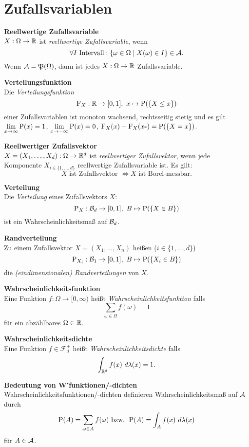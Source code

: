 \section{Zufallsvariablen}
\textbf{Reellwertige Zufallsvariable}\\
$X:\Omega\to\R$ ist \textit{reellwertige Zufallsvariable}, wenn
\[
	\forall I \text{ Intervall}: \{\omega\in\Omega\mid X(\omega)\in I\}\in\A.
\]
Wenn $\A=\mathfrak{P}(\Omega)$, dann ist jedes $X:\Omega\to\R$ Zufallsvariable.

\textbf{Verteilungsfunktion}\\
Die \textit{Verteilungsfunktion}
\[
	\F_X:\R\to[0,1],\ x\mapsto\P(\{X\leq x\})
\]
einer Zufallsvariablen ist monoton wachsend, rechtsseitig stetig und es gilt\\
$\lim\limits_{x\to\infty}\P(x)=1$,
$\lim\limits_{x\to -\infty}\P(x)=0$, 
\mbox{$\F_X(x)-\F_X(x\textbf{-})=\P(\{X=x\})$}.

\textbf{Reellwertiger Zufallsvektor}\\
$X=(X_1,\ldots,X_d):\Omega\to\R^d$ ist \textit{reellwertiger Zufallsvektor}, wenn jede
Komponente $X_{i\in\{1,\ldots,d\}}$ reellwertige Zufallsvariable ist. Es gilt:\\
\[
	X \text{ ist Zufallsvektor } \Leftrightarrow X \text{ ist Borel-messbar.}
\]

\textbf{Verteilung}\\
Die \textit{Verteilung} eines Zufallsvektors $X$: 
\[
	\P_X: \B{d}\to [0,1],\ B\mapsto\P(\{X\in B\})
\]
ist ein Wahrscheinlichkeitsmaß auf $\B{d}$.

\textbf{Randverteilung}\\
Zu einem Zufallsvektor $X=(X_1,\ldots,X_n)$ heißen ($i\in\{1,\ldots,d\}$)
\[
	\P_{X_i} :\B{1}\to[0,1],\ B\mapsto \P(\{X_i\in B\})
\]
die \textit{(eindimensionalen) Randverteilungen} von $X$.

\textbf{Wahrscheinlichkeitsfunktion}\\
Eine Funktion $f:\Omega\to[0,\infty)$ heißt \textit{Wahrscheinlichkeitsfunktion} falls
\[
	  \sum_{\omega\in\Omega} f(\omega)=1
\]
für ein abzählbares $\Omega\in\R$.

\textbf{Wahrscheinlichkeitsdichte}\\
Eine Funktion $f\in\mathcal{F}_d^+$ heißt \textit{Wahrscheinlichkeitsdichte} falls
\[
	 \int_{\R^d} f(x)~d\lambda(x)=1.
\]

\textbf{Bedeutung von W'funktionen/-dichten}\\
Wahrscheinlichkeitsfunktionen/-dichten definieren Wahrscheinlichkeitsmaß auf $\A$
durch 
\[
\P(A)=\sum_{\omega\in A}f(\omega) \text{ bzw. } \P(A)=\int_A f(x)~d\lambda(x)
\]
für $A\in\A$.

